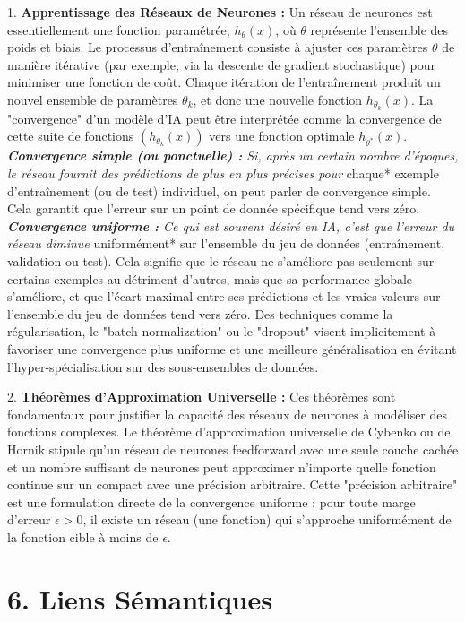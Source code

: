 \documentclass{report}
\begin{document}
1.  \textbf{Apprentissage des Réseaux de Neurones :} Un réseau de neurones est essentiellement une fonction paramétrée, $h_{\theta}(x)$, où $\theta$ représente l'ensemble des poids et biais. Le processus d'entraînement consiste à ajuster ces paramètres $\theta$ de manière itérative (par exemple, via la descente de gradient stochastique) pour minimiser une fonction de coût. Chaque itération de l'entraînement produit un nouvel ensemble de paramètres $\theta_k$, et donc une nouvelle fonction $h_{\theta_k}(x)$. La "convergence" d'un modèle d'IA peut être interprétée comme la convergence de cette suite de fonctions $(h_{\theta_k}(x))$ vers une fonction optimale $h_{\theta^*}(x)$.
    \textit{   \textbf{Convergence simple (ou ponctuelle) :} Si, après un certain nombre d'époques, le réseau fournit des prédictions de plus en plus précises pour }chaque* exemple d'entraînement (ou de test) individuel, on peut parler de convergence simple. Cela garantit que l'erreur sur un point de donnée spécifique tend vers zéro.
    \textit{   \textbf{Convergence uniforme :} Ce qui est souvent désiré en IA, c'est que l'erreur du réseau diminue }uniformément* sur l'ensemble du jeu de données (entraînement, validation ou test). Cela signifie que le réseau ne s'améliore pas seulement sur certains exemples au détriment d'autres, mais que sa performance globale s'améliore, et que l'écart maximal entre ses prédictions et les vraies valeurs sur l'ensemble du jeu de données tend vers zéro. Des techniques comme la régularisation, le "batch normalization" ou le "dropout" visent implicitement à favoriser une convergence plus uniforme et une meilleure généralisation en évitant l'hyper-spécialisation sur des sous-ensembles de données.

2.  \textbf{Théorèmes d'Approximation Universelle :} Ces théorèmes sont fondamentaux pour justifier la capacité des réseaux de neurones à modéliser des fonctions complexes. Le théorème d'approximation universelle de Cybenko ou de Hornik stipule qu'un réseau de neurones feedforward avec une seule couche cachée et un nombre suffisant de neurones peut approximer n'importe quelle fonction continue sur un compact avec une précision arbitraire. Cette "précision arbitraire" est une formulation directe de la convergence uniforme : pour toute marge d'erreur $\epsilon > 0$, il existe un réseau (une fonction) qui s'approche uniformément de la fonction cible à moins de $\epsilon$.

\section*{6. Liens Sémantiques}
\end{document}

